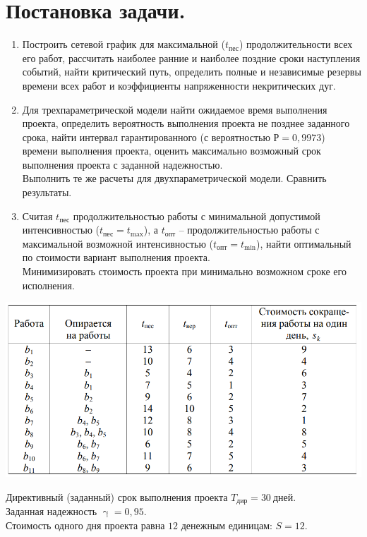 \documentclass[a4paper, 12pt]{report}
\renewcommand{\gamma}{\upgamma}
\begin{document}
	\section*{Постановка задачи.}
	\begin{enumerate}
		\item Построить сетевой график для максимальной ($t_\text{пес}$) продолжительности всех его работ, рассчитать наиболее ранние и наиболее поздние сроки наступления событий, найти критический путь, определить полные и независимые резервы времени всех работ и коэффициенты напряженности некритических дуг.
		\item Для трехпараметрической модели найти ожидаемое время выполнения проекта, определить вероятность выполнения проекта не позднее заданного срока, найти интервал гарантированного (с вероятностью $Р = 0,9973$) времени выполнения проекта, оценить максимально возможный срок выполнения проекта с заданной надежностью.\\
		Выполнить те же расчеты для двухпараметрической модели. Сравнить результаты.
		\item Считая $t_\text{пес}$ продолжительностью работы с минимальной допустимой интенсивностью ($t_\text{пес} = t_\text{max}$), а $t_\text{опт}$ – продолжительностью работы с максимальной возможной интенсивностью ($t_\text{опт} = t_\text{min}$), найти оптимальный по стоимости вариант выполнения проекта.\\
		Минимизировать стоимость проекта при минимально возможном сроке его исполнения.
	\end{enumerate}
\begin{center}
	\includegraphics[scale=0.5]{"img1"}
\end{center}
	Директивный (заданный) срок выполнения проекта $T_\text{дир} = 30 \ \text{дней}$.\\
	Заданная надежность $\gamma = 0,95$.\\
	Стоимость одного дня проекта равна $12$ денежным единицам: $S = 12$.
\end{document}
